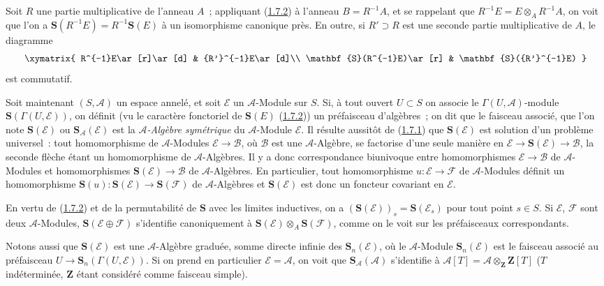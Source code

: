 \begin{env}[1.7.3]
\label{II.1.7.3-fr}
Soit $R$ une partie multiplicative de l'anneau $A$~; appliquant
(\hyperref[II.1.7.2-fr]{1.7.2}) à l'anneau $B=R^{-1}A$, et se rappelant que
$R^{-1}E=E\otimes_A R^{-1}A$, on voit que l'on a
$\mathbf{S}(R^{-1}E)=R^{-1}\mathbf{S}(E)$ à un isomorphisme canonique près.
En outre, si $R'\supset R$ est une seconde partie multiplicative de $A$, le
diagramme
\[
  \xymatrix{
    R^{-1}E\ar[r]\ar[d] & {R'}^{-1}E\ar[d]\\
    \mathbf{S}(R^{-1}E)\ar[r] & \mathbf{S}({R'}^{-1}E)
  }
\]
est commutatif.
\end{env}

\begin{env}[1.7.4]
\label{II.1.7.4-fr}
Soit maintenant $(S,\mathcal{A})$ un espace annelé, et soit $\mathcal{E}$ un
$\mathcal{A}$-Module sur $S$. Si, à tout ouvert $U\subset S$ on associe le
$\Gamma(U,\mathcal{A})$-module
$\mathbf{S}(\Gamma(U,\mathcal{E}))$, on définit (vu le caractère fonctoriel
de $\mathbf{S}(E)$ (\hyperref[II.1.7.2-fr]{1.7.2})) un préfaisceau d'algèbres~;
on dit que le faisceau associé, que l'on note $\mathbf{S}(\mathcal{E})$ ou
$\mathbf{S}_{\mathcal{A}}(\mathcal{E})$ est la \emph{$\mathcal{A}$-Algèbre
symétrique} du $\mathcal{A}$-Module $\mathcal{E}$. Il résulte aussitôt
de (\hyperref[II.1.7.1-fr]{1.7.1}) que $\mathbf{S}(\mathcal{E})$ est solution
d'un problème universel~: tout homomorphisme de $\mathcal{A}$-Modules
$\mathcal{E}\to\mathcal{B}$, où $\mathcal{B}$ est une $\mathcal{A}$-Algèbre,
se factorise d'une seule manière en
$\mathcal{E}\to\mathbf{S}(\mathcal{E})\to\mathcal{B}$, la seconde flèche étant
un homomorphisme de $\mathcal{A}$-Algèbres. Il y a donc correspondance
biunivoque entre homomorphismes $\mathcal{E}\to\mathcal{B}$ de
$\mathcal{A}$-Modules et homomorphismes
$\mathbf{S}(\mathcal{E})\to\mathcal{B}$ de $\mathcal{A}$-Algèbres. En
particulier, tout homomorphisme $u:\mathcal{E}\to\mathcal{F}$ de
$\mathcal{A}$-Modules définit un homomorphisme
$\mathbf{S}(u):\mathbf{S}(\mathcal{E})\to\mathbf{S}(\mathcal{F})$ de
$\mathcal{A}$-Algèbres et $\mathbf{S}(\mathcal{E})$ est donc un foncteur
covariant en $\mathcal{E}$.

En vertu de (\hyperref[II.1.7.2-fr]{1.7.2}) et de la permutabilité de
$\mathbf{S}$ avec les limites inductives, on a
$(\mathbf{S}(\mathcal{E}))_s=\mathbf{S}(\mathcal{E}_s)$ pour tout point
$s\in S$. Si $\mathcal{E}$, $\mathcal{F}$ sont deux $\mathcal{A}$-Modules,
$\mathbf{S}(\mathcal{E}\oplus\mathcal{F})$ s'identifie canoniquement à
$\mathbf{S}(\mathcal{E})\otimes_A\mathbf{S}(\mathcal{F})$,
comme on le voit sur les préfaisceaux correspondants.

Notons aussi que $\mathbf{S}(\mathcal{E})$ est une $\mathcal{A}$-Algèbre
graduée, somme directe infinie des $\mathbf{S}_n(\mathcal{E})$, où le
$\mathcal{A}$-Module $\mathbf{S}_n(\mathcal{E})$ est le faisceau associé au
préfaisceau $U\to\mathbf{S}_n(\Gamma(U,\mathcal{E}))$. Si on prend en
particulier $\mathcal{E}=\mathcal{A}$, on voit que
$\mathbf{S}_{\mathcal{A}}(\mathcal{A})$ s'identifie à
$\mathcal{A}[T]=\mathcal{A}\otimes_{\mathbf{Z}}\mathbf{Z}[T]$
($T$ indéterminée, $\mathbf{Z}$ étant considéré comme faisceau simple).
\end{env}

